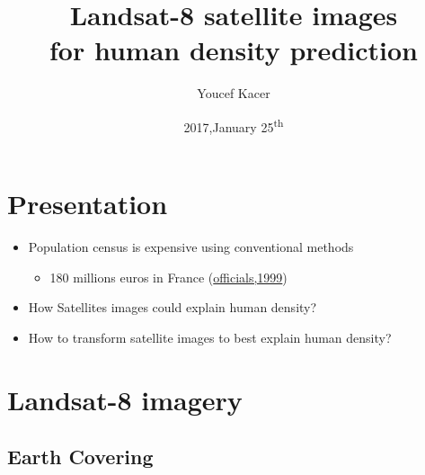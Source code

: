 \documentclass[c]{beamer}
\title[Satellite images for human density prediction]{Landsat-8 satellite images \\for human density prediction}
\author{Youcef Kacer}
\institute{\href{http://www.github.com/ykacer/}{www.github.com/ykacer}}
\date{2017,January 25\textsuperscript{th}}
\begin{document}
\begin{frame}
\titlepage
{}
\end{frame}

\begin{frame}
\tableofcontents
\end{frame}

\section{Presentation}
\begin{frame}
\tableofcontents[currentsection]
\end{frame}

\begin{frame}
\begin{itemize}
\item Population census is expensive using conventional methods\\
  \begin{itemize}
  \item 180 millions euros in France (\href{http://www.assemblee-nationale.fr/13/rap-info/i1246.asp}{officials,1999})\\ 
  \end{itemize}
\item How Satellites images could explain human density?\\
\item How to transform satellite images to best explain human density?\\
\end{itemize}
\end{frame}

\section{Landsat-8 imagery}
\begin{frame}
\tableofcontents[currentsection]
\end{frame}

\subsection{Earth Covering}
\begin{frame}
\tableofcontents[currentsubsection]
\end{frame}
\end{document}
